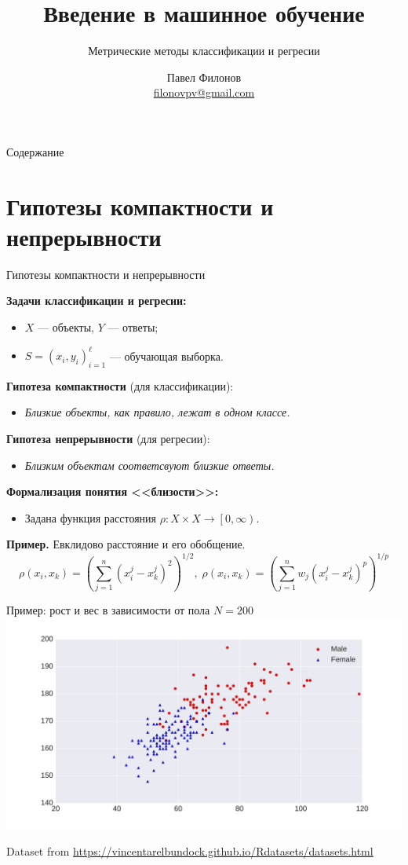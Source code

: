 \documentclass{beamer}
\author{Павел Филонов \\ \href{mailto:filonovpv@gmail.com}{filonovpv@gmail.com}}
\title{Введение в машинное обучение}
\subtitle{Метрические методы классификации и регресии}
\begin{document}
\begin{frame}[plain]
    \titlepage
\end{frame}
\begin{frame}[plain]{Содержание}
  \tableofcontents
\end{frame}
\section{Гипотезы компактности и непрерывности}
\begin{frame}{Гипотезы компактности и непрерывности}

{\bf Задачи классификации и регресии:}
\begin{itemize}
    \item[] $X$ --- объекты, $Y$ --- ответы;
    \item[] $S = (x_i, y_i)_{i=1}^{\ell}$ --- обучающая выборка.
\end{itemize}

{\bf Гипотеза компактности} (для классификации):
\begin{itemize}
    \item[] {\it Близкие объекты, как правило, лежат в одном классе.}
\end{itemize}

{\bf Гипотеза непрерывности} (для регресии):
\begin{itemize}
    \item[] {\it Близким объектам соответсвуют близкие ответы.}
\end{itemize}

{\bf Формализация понятия <<близости>>:}
\begin{itemize}
    \item[] Задана функция расстояния $\rho : X \times X \rightarrow \left[ 0, \infty \right)$.
\end{itemize}

{\bf Пример.} Евклидово расстояние и его обобщение.
$$
    \rho(x_i, x_k) = \left(\sum\limits_{j=1}^{n}(x_i^j - x_k^j)^2\right)^{1/2},\;  \rho(x_i, x_k) = \left(\sum\limits_{j=1}^{n}w_j(x_i^j - x_k^j)^p\right)^{1/p}
$$
\end{frame}

\begin{frame}{Пример: рост и вес в зависимости от пола}
$N = 200$
\includegraphics[width=\linewidth]{../fig/height_n_weight.pdf}

\footnotesize
Dataset from \url{https://vincentarelbundock.github.io/Rdatasets/datasets.html}
\end{frame}
\end{document}

